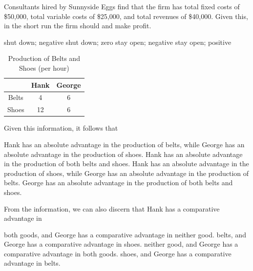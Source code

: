 \documentclass[addpoints,11pt]{exam}
\theoremstyle{definition}
\newcommand{\blank}[0]{\underline{\hspace{3cm}}}
\begin{document}
\begin{questions}
	
	\question Consultants hired by Sunnyside Eggs find that the firm has total fixed costs of \$50,000, total variable costs of \$25,000, and total revenues of \$40,000. Given this, in the short run the firm should \blank and make \blank profit.
	
	\begin{choices}
		\choice shut down; negative
		\choice shut down; zero
		\CorrectChoice stay open; negative
		\choice stay open; positive
	\end{choices}

		
	
	\begin{table}[ht]
		\caption{Production of Belts and Shoes (per hour)}
		\centering
		\begin{tabular}{  c| c c} 
			
			& Hank & George \\
			\hline
			Belts & 4 & 6 \\
			Shoes & 12 & 6 \\
		\end{tabular}
		\label{MC8}
	\end{table}

	
\question \label{q8} Given this information, it follows that 

\begin{choices}
	\choice Hank has an absolute advantage in the production of belts, while George has an absolute advantage in the production of shoes.
	\choice Hank has an absolute advantage in the production of both belts and shoes.
	\CorrectChoice Hank has an absolute advantage in the production of shoes, while George has an absolute advantage in the production of belts.
	\choice George has an absolute advantage in the production of both belts and shoes.
\end{choices}

\question \label{q9} From the information, we can also discern that Hank has a comparative advantage in 

\begin{choices}
	\choice both goods, and George has a comparative advantage in neither good.
	\choice belts, and George has a comparative advantage in shoes.
	\choice neither good, and George has a comparative advantage in both goods.
	\CorrectChoice shoes, and George has a comparative advantage in belts.
\end{choices}



\end{questions}
\end{document}
